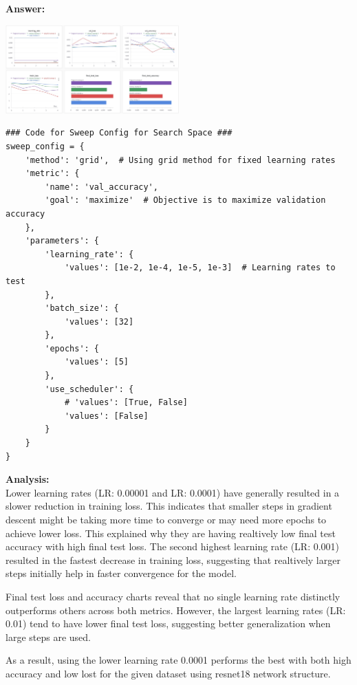 \documentclass[11pt, oneside]{article}   	%
\begin{document}
\textbf{Answer:} \\
\begin{center}
    \includegraphics[width=0.5\textwidth]{p2p1_pic/SweepChart1.png}
\end{center}

\begin{verbatim}
### Code for Sweep Config for Search Space ###
sweep_config = {
    'method': 'grid',  # Using grid method for fixed learning rates
    'metric': {
        'name': 'val_accuracy',
        'goal': 'maximize'  # Objective is to maximize validation accuracy
    },
    'parameters': {
        'learning_rate': {
            'values': [1e-2, 1e-4, 1e-5, 1e-3]  # Learning rates to test
        },
        'batch_size': {
            'values': [32]
        },
        'epochs': {
            'values': [5]
        },
        'use_scheduler': {
            # 'values': [True, False]
            'values': [False]
        }
    }
}
\end{verbatim}

\textbf{Analysis: }
\\
Lower learning rates (LR: 0.00001 and LR: 0.0001) have generally resulted in a slower reduction in training loss. This indicates that smaller steps in gradient descent might be taking more time to converge or may need more epochs to achieve lower loss. This explained why they are having realtively low final test accuracy with high final test loss.
The second highest learning rate (LR: 0.001) resulted in the fastest decrease in training loss, suggesting that realtively larger steps initially help in faster convergence for the model.

Final test loss and accuracy charts reveal that no single learning rate distinctly outperforms others across both metrics. However, the largest learning rates (LR: 0.01) tend to have lower final test loss, suggesting better generalization when large steps are used.

As a result, using the lower learning rate 0.0001 performs the best with both high accuracy and low lost for the given dataset using resnet18 network structure.
\end{document}
